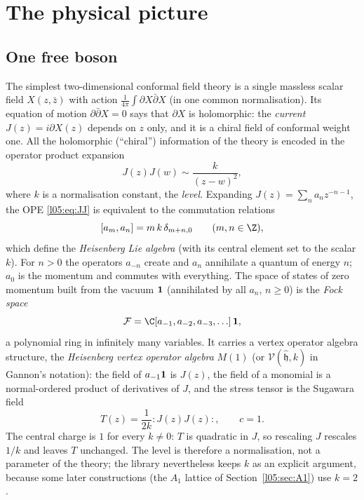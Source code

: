 \section{The physical picture}\label{l05:sec:physics}

\subsection{One free boson}

The simplest two-dimensional conformal field theory is a single massless scalar field
$X(z,\bar z)$ with action $\frac{1}{4\pi}\int\partial X\bar\partial X$ (in one common normalisation).
Its equation of motion $\partial\bar\partial X=0$ says that $\partial X$ is holomorphic: the
\emph{current} $J(z)=i\partial X(z)$ depends on $z$ only, and it is a chiral field of conformal
weight one. All the holomorphic (``chiral'') information of the theory is encoded in the
operator product expansion
\begin{equation}\label{l05:eq:JJ}
 J(z)J(w)\sim\frac{k}{(z-w)^2},
\end{equation}
where $k$ is a normalisation constant, the \emph{level}. Expanding $J(z)=\sum_n a_nz^{-n-1}$, the
OPE \eqref{l05:eq:JJ} is equivalent to the commutation relations
\begin{equation}\label{l05:eq:heis}
 [a_m,a_n]=m\,k\,\delta_{m+n,0}\qquad(m,n\in\Z),
\end{equation}
which define the \emph{Heisenberg Lie algebra} (with its central element set to the scalar $k$).
For $n>0$ the operators $a_{-n}$ create and $a_n$ annihilate a quantum of energy $n$; $a_0$ is the
momentum and commutes with everything. The space of states of zero momentum built from the vacuum
$\mathbf{1}$ (annihilated by all $a_n$, $n\ge0$) is the \emph{Fock space}
\begin{equation*}
 \lfiveF=\C[a_{-1},a_{-2},a_{-3},\ldots]\,\lfivevac ,
\end{equation*}
a polynomial ring in infinitely many variables. It carries a vertex operator algebra structure, the
\emph{Heisenberg vertex operator algebra} $M(1)$ (or $\mathcal V(\hat{\mathfrak h},k)$ in Gannon's
notation): the field of $a_{-1}\mathbf{1}$ is $J(z)$, the field of a monomial is a normal-ordered
product of derivatives of $J$, and the stress tensor is the Sugawara field
\begin{equation}\label{l05:eq:T}
 T(z)=\frac{1}{2k}{:}J(z)J(z){:},\qquad c=1 .
\end{equation}
The central charge is $1$ for every $k\neq0$: $T$ is quadratic in $J$, so rescaling $J$ rescales
$1/k$ and leaves $T$ unchanged. The level is therefore a normalisation, not a parameter of the
theory; the library nevertheless keeps $k$ as an explicit argument, because some later constructions
(the $A_1$ lattice of Section~\ref{l05:sec:A1}) use $k=2$.

